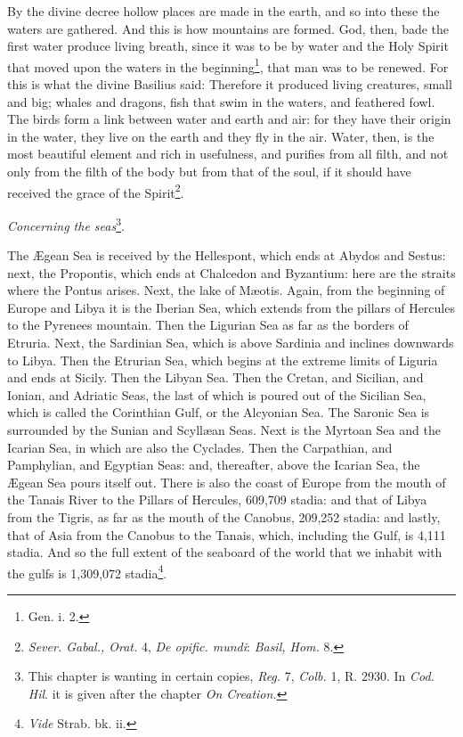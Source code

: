 By the divine decree hollow places are made in the earth, and so into these the waters are gathered. And this is how mountains are formed. God, then, bade the first water produce living breath, since it was to be by water and the Holy Spirit that moved upon the waters in the beginning\footnote{Gen. i. 2.}, that man was to be renewed. For this is what the divine Basilius said: Therefore it produced living creatures, small and big; whales and dragons, fish that swim in the waters, and feathered fowl. The birds form a link between water and earth and air: for they have their origin in the water, they live on the earth and they fly in the air. Water, then, is the most beautiful element and rich in usefulness, and purifies from all filth, and not only from the filth of the body but from that of the soul, if it should have received the grace of the Spirit\footnote{\emph{Sever. Gabal., Orat. }4, \emph{De opific. mundi}: \emph{Basil, Hom.} 8.}.

\emph{Concerning the seas}\footnote{This chapter is wanting in certain copies, \emph{Reg. }7, \emph{Colb. }1, R. 2930. In \emph{Cod. Hil}. it is given after the chapter \emph{On Creation.}}.

The Ægean Sea is received by the Hellespont, which ends at Abydos and Sestus: next, the Propontis, which ends at Chalcedon and Byzantium: here are the straits where the Pontus arises. Next, the lake of Mæotis. Again, from the beginning of Europe and Libya it is the Iberian Sea, which extends from the pillars of Hercules to the Pyrenees mountain. Then the Ligurian Sea as far as the borders of Etruria. Next, the Sardinian Sea, which is above Sardinia and inclines downwards to Libya. Then the Etrurian Sea, which begins at the extreme limits of Liguria and ends at Sicily. Then the Libyan Sea. Then the Cretan, and Sicilian, and Ionian, and Adriatic Seas, the last of which is poured out of the Sicilian Sea, which is called the Corinthian Gulf, or the Alcyonian Sea. The Saronic Sea is surrounded by the Sunian and Scyllæan Seas. Next is the Myrtoan Sea and the Icarian Sea, in which are also the Cyclades. Then the Carpathian, and Pamphylian, and Egyptian Seas: and, thereafter, above the Icarian Sea, the Ægean Sea pours itself out. There is also the coast of Europe from the mouth of the Tanais River to the Pillars of Hercules, 609,709 stadia: and that of Libya from the Tigris, as far as the mouth of the Canobus, 209,252 stadia: and lastly, that of Asia from the Canobus to the Tanais, which, including the Gulf, is 4,111 stadia. And so the full extent of the seaboard of the world that we inhabit with the gulfs is 1,309,072 stadia\footnote{\emph{Vide }Strab. bk. ii.}.

